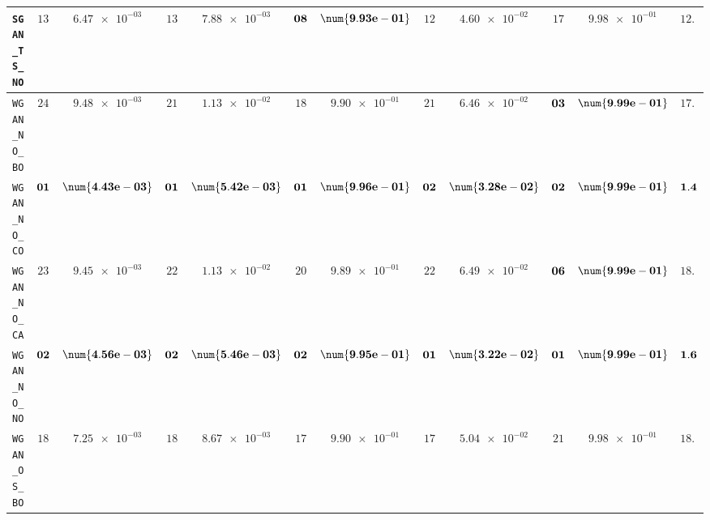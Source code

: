 \begin{table}[H]
\begin{tabularx}{\textwidth}{l||cC|cC|cC|cC|cC||c}
		\texttt{SGAN\_TS\_NO} & $ 13$ & $ \num{6.47e-03}$ & $ 13$ & $ \num{7.88e-03}$ & $\bf 08$ & $\bf \num{9.93e-01}$ & $ 12$ & $ \num{4.60e-02}$ & $ 17$ & $ \num{9.98e-01}$ & $ 12.6$  \\ \hline
		\texttt{WGAN\_NO\_BO} & $ 24$ & $ \num{9.48e-03}$ & $ 21$ & $ \num{1.13e-02}$ & $ 18$ & $ \num{9.90e-01}$ & $ 21$ & $ \num{6.46e-02}$ & $\bf 03$ & $\bf \num{9.99e-01}$ & $ 17.4$  \\
		\texttt{WGAN\_NO\_CO} & $\bf 01$ & $\bf \num{4.43e-03}$ & $\bf 01$ & $\bf \num{5.42e-03}$ & $\bf 01$ & $\bf \num{9.96e-01}$ & $\bf 02$ & $\bf \num{3.28e-02}$ & $\bf 02$ & $\bf \num{9.99e-01}$ & $\bf 1.4$  \\
		\texttt{WGAN\_NO\_CA} & $ 23$ & $ \num{9.45e-03}$ & $ 22$ & $ \num{1.13e-02}$ & $ 20$ & $ \num{9.89e-01}$ & $ 22$ & $ \num{6.49e-02}$ & $\bf 06$ & $\bf \num{9.99e-01}$ & $ 18.6$  \\
		\texttt{WGAN\_NO\_NO} & $\bf 02$ & $\bf \num{4.56e-03}$ & $\bf 02$ & $\bf \num{5.46e-03}$ & $\bf 02$ & $\bf \num{9.95e-01}$ & $\bf 01$ & $\bf \num{3.22e-02}$ & $\bf 01$ & $\bf \num{9.99e-01}$ & $\bf 1.6$  \\
		\texttt{WGAN\_OS\_BO} & $ 18$ & $ \num{7.25e-03}$ & $ 18$ & $ \num{8.67e-03}$ & $ 17$ & $ \num{9.90e-01}$ & $ 17$ & $ \num{5.04e-02}$ & $ 21$ & $ \num{9.98e-01}$ & $ 18.2$  \\

\end{tabularx}
\end{table}
